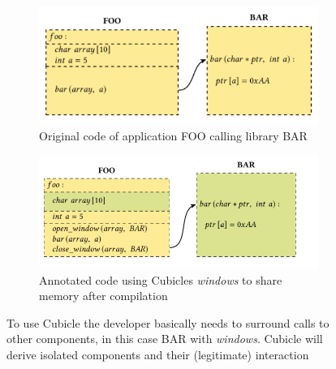 \begin{figure}[H]
    \begin{subfigure}[b]{0.45\textwidth}
         \includegraphics[width=\textwidth]{figures/cubicle_example_original.png}
         \caption{Original code of application FOO calling library BAR}
         \label{cubicleOriginal}
     \end{subfigure}
     \hfill
     \begin{subfigure}[b]{0.45\textwidth}
         \includegraphics[width=\textwidth]{figures/cubicle_example_windows.png}
         \caption{Annotated code using Cubicles \textit{windows} to share memory after compilation}
         \label{cubicleWindow}
     \end{subfigure}
    \caption{To use Cubicle the developer basically needs to surround calls to other components, in this case BAR with \textit{windows}. Cubicle will derive isolated components and their (legitimate) interaction}
    \label{fig:CubicleAPI}
    \end{figure}

